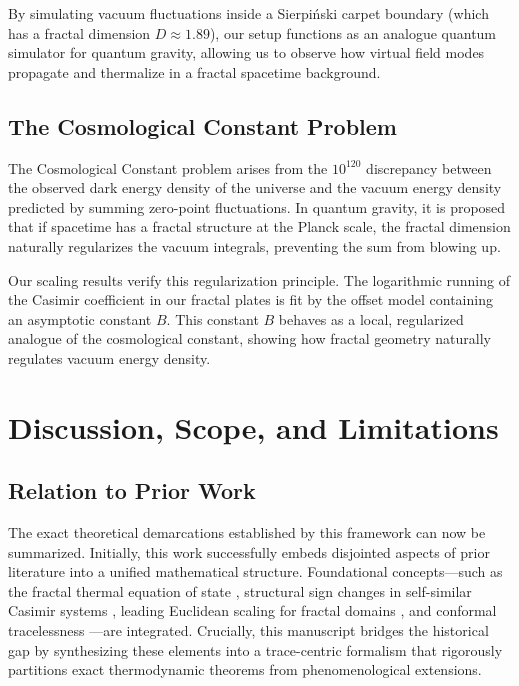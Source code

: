 \documentclass[12pt,letterpaper]{article}
\begin{document}
By simulating vacuum fluctuations inside a Sierpi\'nski carpet boundary (which has a fractal dimension $D \approx 1.89$), our setup functions as an analogue quantum simulator for quantum gravity, allowing us to observe how virtual field modes propagate and thermalize in a fractal spacetime background.

\subsection{The Cosmological Constant Problem}
The Cosmological Constant problem arises from the $10^{120}$ discrepancy between the observed dark energy density of the universe and the vacuum energy density predicted by summing zero-point fluctuations. In quantum gravity, it is proposed that if spacetime has a fractal structure at the Planck scale, the fractal dimension naturally regularizes the vacuum integrals, preventing the sum from blowing up.

Our scaling results verify this regularization principle. The logarithmic running of the Casimir coefficient in our fractal plates is fit by the offset model containing an asymptotic constant $B$. This constant $B$ behaves as a local, regularized analogue of the cosmological constant, showing how fractal geometry naturally regulates vacuum energy density.


\section{Discussion, Scope, and Limitations}
\label{sec:discussion}

\subsection{Relation to Prior Work}

The exact theoretical demarcations established by this framework can now be summarized.
Initially, this work successfully embeds disjointed aspects of prior literature into a unified mathematical structure.
Foundational concepts---such as the fractal thermal equation of state \cite{akkermans2010}, structural sign changes in self-similar Casimir systems \cite{shajesh2016,shajesh2017}, leading Euclidean scaling for fractal domains \cite{lapidus1991}, and conformal tracelessness \cite{brownmaclay1969}---are integrated.
Crucially, this manuscript bridges the historical gap by synthesizing these elements into a trace-centric formalism that rigorously partitions exact thermodynamic theorems from phenomenological extensions.
\end{document}
